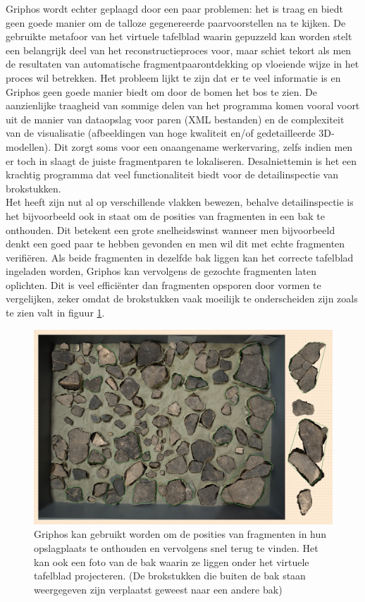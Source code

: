Griphos wordt echter geplaagd door een paar problemen: het is traag en biedt geen goede manier om de talloze gegenereerde paarvoorstellen na te kijken. De gebruikte metafoor van het virtuele tafelblad waarin gepuzzeld kan worden stelt een belangrijk deel van het reconstructieproces voor, maar schiet tekort als men de resultaten van automatische fragmentpaarontdekking op vloeiende wijze in het proces wil betrekken. Het probleem lijkt te zijn dat er te veel informatie is en Griphos geen goede manier biedt om door de bomen het bos te zien. De aanzienlijke traagheid van sommige delen van het programma komen vooral voort uit de manier van dataopslag voor paren (XML bestanden) en de complexiteit van de visualisatie (afbeeldingen van hoge kwaliteit en/of gedetailleerde 3D-modellen). Dit zorgt soms voor een onaangename werkervaring, zelfs indien men er toch in slaagt de juiste fragmentparen te lokaliseren. Desalniettemin is het een krachtig programma dat veel functionaliteit biedt voor de detailinspectie van brokstukken.\\

Het heeft zijn nut al op verschillende vlakken bewezen, behalve detailinspectie is het bijvoorbeeld ook in staat om de posities van fragmenten in een bak te onthouden. Dit betekent een grote snelheidswinst wanneer men bijvoorbeeld denkt een goed paar te hebben gevonden en men wil dit met echte fragmenten verifi\"eren. Als beide fragmenten in dezelfde bak liggen kan het correcte tafelblad ingeladen worden, Griphos kan vervolgens de gezochte fragmenten laten oplichten. Dit is veel effici\"enter dan fragmenten opsporen door vormen te vergelijken, zeker omdat de brokstukken vaak moeilijk te onderscheiden zijn zoals te zien valt in figuur \ref{fig:griphosbak}. 

\begin{figure}[ht]
	\begin{center}
		\includegraphics[width=.8\columnwidth]{images/griphos-bak-01.png}
		\caption{Griphos kan gebruikt worden om de posities van fragmenten in hun opslagplaats te onthouden en vervolgens snel terug te vinden. Het kan ook een foto van de bak waarin ze liggen onder het virtuele tafelblad projecteren. (De brokstukken die buiten de bak staan weergegeven zijn verplaatst geweest naar een andere bak)}
		\label{fig:griphosbak}
	\end{center}
\end{figure}



